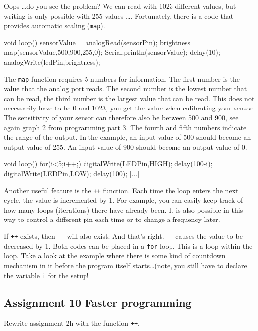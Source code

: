 \documentclass{arduino}
\begin{document}
Oops \dots do you see the problem? We can read with 1023 different values, but writing is only possible with 255 values ​​\dots. Fortunately, there is a code that provides automatic scaling (\lstinline{map}).

\begin{marginlisting}
void loop() {
  sensorValue = analogRead(sensorPin);
  brightness = map(sensorValue,500,900,255,0);
  Serial.println(sensorValue);
  delay(10);
  analogWrite(ledPin,brightness);
}
\end{marginlisting}
The \lstinline{map} function requires 5 numbers for information. The first number is the value that the analog port reads. The second number is the lowest number that can be read, the third number is the largest value that can be read. This does not necessarily have to be 0 and 1023, you get the value when calibrating your sensor. The sensitivity of your sensor can therefore also be between 500 and 900, see again graph 2 from programming part 3. The fourth and fifth numbers indicate the range of the output. In the example, an input value of 500 should become an output value of 255. An input value of 900 should become an output value of 0.

\begin{marginlisting}
void loop(){
  for(i<5;i++;) {
    digitalWrite(LEDPin,HIGH);
    delay(100-i);
    digitalWrite(LEDPin,LOW);
    delay(100);
  }
  [...]
}
\end{marginlisting}
Another useful feature is the \lstinline{++} function. Each time the loop enters the next cycle, the value is incremented by 1. For example, you can easily keep track of how many loops (iterations) there have already been. It is also possible in this way to control a different pin each time or to change a frequency later.

If \lstinline{++} exists, then \lstinline{--} will also exist. And that's right. \lstinline{--} causes the value to be decreased by 1. Both codes can be placed in a \lstinline{for} loop. This is a loop within the loop. Take a look at the example where there is some kind of countdown mechanism in it before the program itself starts\dots (note, you still have to declare the variable \lstinline{i} for the setup!

\subsection{Assignment 10 Faster programming}

Rewrite assignment 2h with the function \lstinline{++}.
\end{document}
